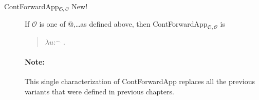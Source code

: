 \begin{description}
    
    
\item[\textnormal{ContForwardApp$_{\mathfrak{S},\mathcal{O}}$} New!]
  \mbox{}

  If $\mathcal{O}$ is one of @,\ldots as defined above, then
ContForwardApp$_{\mathfrak{S},\mathcal{O}}$ is
\begin{quote}
  $\lambda u$:$^\frown$ . 
\end{quote}

\paragraph{Note:}  This single characterization of ContForwardApp
replaces all the previous variants that were defined in previous chapters.







\end{description}
